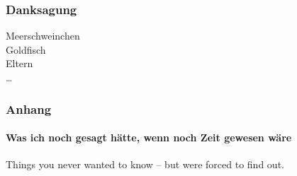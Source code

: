 \documentclass[utf8]{beamer}
\begin{document}
\begin{frame}
\frametitle{Danksagung}

Meerschweinchen\\
Goldfisch\\
Eltern\\
\ldots

\vspace*{\fill}

\begin{center}
\end{center}

\end{frame}

\setcounter{finalframe}{\value{framenumber}}
\appendix


\begin{frame}
\frametitle{Anhang}
\framesubtitle{Was ich noch gesagt hätte, wenn noch Zeit gewesen wäre}

Things you never wanted to know -- but were forced to find out.

\end{frame}

\setcounter{framenumber}{\value{finalframe}}
\end{document}
